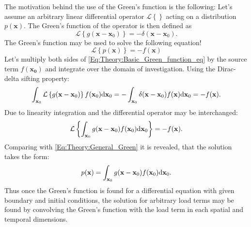 The motivation behind the use of the Green's function is the following:
Let's assume an arbitrary linear differential operator $\mathcal{L}\left\{ \right\}$ acting on a distribution $p(\mathbf{x})$. The Green's function of the operator is then defined as
\begin{equation}
\mathcal{L}\left\{ g(\mathbf{x}-\mathbf{x}_0) \right\} = -\delta( \mathbf{x}-\mathbf{x}_0 ).
\label{Eq:Theory:Basic_Green_function_eq}
\end{equation}
The Green's function may be used to solve the following equation!
\begin{equation}
\mathcal{L}\left\{ p(\mathbf{x}) \right\} = -f(\mathbf{x})
\label{Eq:Theory:General_Green}
\end{equation}
Let's multiply both sides of \eqref{Eq:Theory:Basic_Green_function_eq} by the source term $f(\mathbf{x_0})$ and integrate over the domain of investigation. Using the Dirac-delta sifting property:
\begin{equation}
\int_{\mathbf{x}_0} \mathcal{L}\left\{ g(\mathbf{x}-\mathbf{x}_0) \right\} f(\mathbf{x}_0) \mathrm{d} \mathbf{x}_0  = -\int_{\mathbf{x}_0 } \delta( \mathbf{x}-\mathbf{x}_0 ) f(\mathbf{x}) \mathrm{d} \mathbf{x}_0  = -f(\mathbf{x}).
\end{equation}
Due to linearity integration and the differential operator may be interchanged:
\begin{equation}
\mathcal{L}\left\{ \int_{\mathbf{x}_0 }  g(\mathbf{x}-\mathbf{x}_0) f(\mathbf{x}_0) \mathrm{d} \mathbf{x}_0  \right\} 
= -f(\mathbf{x}).
\end{equation}
Comparing with \eqref{Eq:Theory:General_Green} it is revealed, that the solution takes the form:
\begin{equation}
p(\mathbf{x}) = \int_{\mathbf{x}_0 }  g(\mathbf{x}-\mathbf{x}_0) f(\mathbf{x}_0) \mathrm{d} \mathbf{x}_0.
\end{equation}
Thus once the Green's function is found for a differential equation with given boundary and initial conditions, the solution for arbitrary load terms may be found by convolving the Green's function with the load term in each spatial and temporal dimensions.

